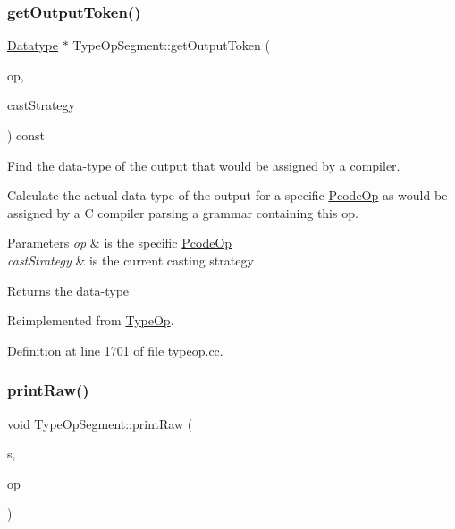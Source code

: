 \subsubsection{\texorpdfstring{getOutputToken()}{getOutputToken()}}
{\footnotesize\ttfamily \mbox{\hyperlink{class_datatype}{Datatype}} $\ast$ Type\+Op\+Segment\+::get\+Output\+Token (\begin{DoxyParamCaption}\item[{const \mbox{\hyperlink{class_pcode_op}{Pcode\+Op}} $\ast$}]{op,  }\item[{\mbox{\hyperlink{class_cast_strategy}{Cast\+Strategy}} $\ast$}]{cast\+Strategy }\end{DoxyParamCaption}) const\hspace{0.3cm}{\ttfamily [virtual]}}



Find the data-\/type of the output that would be assigned by a compiler. 

Calculate the actual data-\/type of the output for a specific \mbox{\hyperlink{class_pcode_op}{Pcode\+Op}} as would be assigned by a C compiler parsing a grammar containing this op. 
\begin{DoxyParams}{Parameters}
{\em op} & is the specific \mbox{\hyperlink{class_pcode_op}{Pcode\+Op}} \\
\hline
{\em cast\+Strategy} & is the current casting strategy \\
\hline
\end{DoxyParams}
\begin{DoxyReturn}{Returns}
the data-\/type 
\end{DoxyReturn}


Reimplemented from \mbox{\hyperlink{class_type_op_a7150ac93bb03a993735c829deb5237e7}{Type\+Op}}.



Definition at line 1701 of file typeop.\+cc.

\mbox{\label{class_type_op_segment_aa0faf7a0a8f5094b7b851bcefca5051f}} 
\subsubsection{\texorpdfstring{printRaw()}{printRaw()}}
{\footnotesize\ttfamily void Type\+Op\+Segment\+::print\+Raw (\begin{DoxyParamCaption}\item[{ostream \&}]{s,  }\item[{const \mbox{\hyperlink{class_pcode_op}{Pcode\+Op}} $\ast$}]{op }\end{DoxyParamCaption})\hspace{0.3cm}{\ttfamily [virtual]}}



